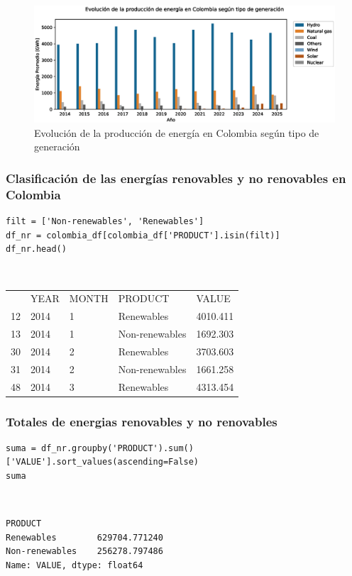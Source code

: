 \documentclass{article}
\begin{document}
\begin{figure}[t]
	\centering
	\includegraphics[width=0.7\linewidth]{fig_9}
	\caption{Evolución de la producción de energía en Colombia según tipo de generación}
	\label{fig:fig9}
\end{figure}

\subsubsection{Clasificaci\'on de las energ\'ias renovables y no renovables en Colombia}

\begin{verbatim}
filt = ['Non-renewables', 'Renewables']
df_nr = colombia_df[colombia_df['PRODUCT'].isin(filt)]
df_nr.head()
\end{verbatim}

{\tt 
\begin{tabular}{lllll}
	&YEAR	&MONTH	&PRODUCT	&VALUE\\
12	&2014	&1	&Renewables	&4010.411\\
13	&2014	&1	&Non-renewables	&1692.303\\
30	&2014	&2	&Renewables	&3703.603\\
31	&2014	&2	&Non-renewables	&1661.258\\
48	&2014	&3	&Renewables	&4313.454\\
\end{tabular}
}

\subsubsection{Totales de energias renovables y no renovables}

\begin{verbatim}
suma = df_nr.groupby('PRODUCT').sum()['VALUE'].sort_values(ascending=False)
suma
\end{verbatim}

{\tt
\begin{verbatim}
PRODUCT
Renewables        629704.771240
Non-renewables    256278.797486
Name: VALUE, dtype: float64
\end{verbatim}
}
\end{document}
